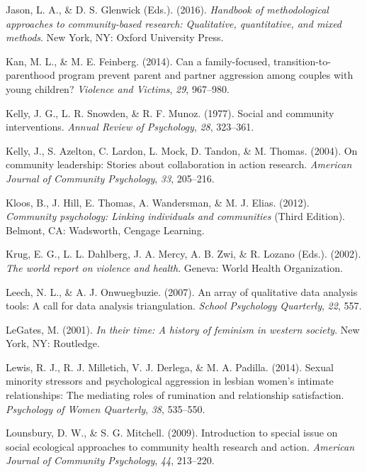 \documentclass[11pt,]{tufte-book}
\begin{document}
\hypertarget{ref-jason2016handbook}{}
Jason, L. A., \& D. S. Glenwick (Eds.). (2016). \emph{Handbook of
methodological approaches to community-based research: Qualitative,
quantitative, and mixed methods}. New York, NY: Oxford University Press.

\hypertarget{ref-kan2014can}{}
Kan, M. L., \& M. E. Feinberg. (2014). Can a family-focused,
transition-to-parenthood program prevent parent and partner aggression
among couples with young children? \emph{Violence and Victims},
\emph{29}, 967--980.

\hypertarget{ref-kelly1977social}{}
Kelly, J. G., L. R. Snowden, \& R. F. Munoz. (1977). Social and
community interventions. \emph{Annual Review of Psychology}, \emph{28},
323--361.

\hypertarget{ref-kelly2004community}{}
Kelly, J., S. Azelton, C. Lardon, L. Mock, D. Tandon, \& M. Thomas.
(2004). On community leadership: Stories about collaboration in action
research. \emph{American Journal of Community Psychology}, \emph{33},
205--216.

\hypertarget{ref-kloos2012community}{}
Kloos, B., J. Hill, E. Thomas, A. Wandersman, \& M. J. Elias. (2012).
\emph{Community psychology: Linking individuals and communities} (Third
Edition). Belmont, CA: Wadsworth, Cengage Learning.

\hypertarget{ref-krug2002world}{}
Krug, E. G., L. L. Dahlberg, J. A. Mercy, A. B. Zwi, \& R. Lozano
(Eds.). (2002). \emph{The world report on violence and health}. Geneva:
World Health Organization.

\hypertarget{ref-leech2007array}{}
Leech, N. L., \& A. J. Onwuegbuzie. (2007). An array of qualitative data
analysis tools: A call for data analysis triangulation. \emph{School
Psychology Quarterly}, \emph{22}, 557.

\hypertarget{ref-legates2001their}{}
LeGates, M. (2001). \emph{In their time: A history of feminism in
western society}. New York, NY: Routledge.

\hypertarget{ref-lewis2014sexual}{}
Lewis, R. J., R. J. Milletich, V. J. Derlega, \& M. A. Padilla. (2014).
Sexual minority stressors and psychological aggression in lesbian
women's intimate relationships: The mediating roles of rumination and
relationship satisfaction. \emph{Psychology of Women Quarterly},
\emph{38}, 535--550.

\hypertarget{ref-lounsbury2009introduction}{}
Lounsbury, D. W., \& S. G. Mitchell. (2009). Introduction to special
issue on social ecological approaches to community health research and
action. \emph{American Journal of Community Psychology}, \emph{44},
213--220.
\end{document}
